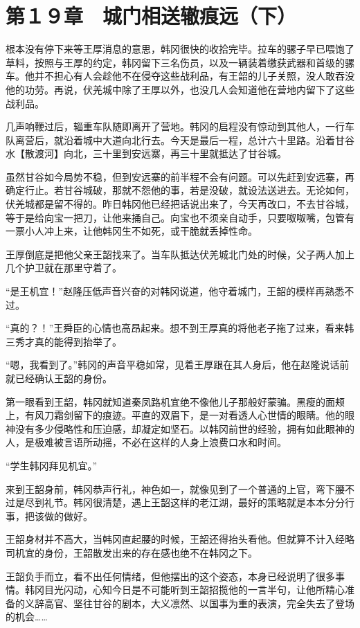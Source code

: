 \section{第１９章　城门相送辙痕远（下）}

根本没有停下来等王厚消息的意思，韩冈很快的收拾完毕。拉车的骡子早已喂饱了草料，按照与王厚的约定，韩冈留下三名伤员，以及一辆装着缴获武器和首级的骡车。他并不担心有人会趁他不在侵夺这些战利品，有王韶的儿子关照，没人敢吞没他的功劳。再说，伏羌城中除了王厚以外，也没几人会知道他在营地内留下了这些战利品。

几声响鞭过后，辎重车队随即离开了营地。韩冈的启程没有惊动到其他人，一行车队离营后，就沿着城中大道向北行去。今天是最后一程，总计六十里路。沿着甘谷水【散渡河】向北，三十里到安远寨，再三十里就抵达了甘谷城。

虽然甘谷如今局势不稳，但到安远寨的前半程不会有问题。可以先赶到安远寨，再确定行止。若甘谷城破，那就不怨他的事，若是没破，就设法送进去。无论如何，伏羌城都是留不得的。昨日韩冈他已经把话说出来了，今天再改口，不去甘谷城，等于是给向宝一把刀，让他来捅自己。向宝也不须亲自动手，只要呶呶嘴，包管有一票小人冲上来，让他韩冈生不如死，或干脆就丢掉性命。

王厚倒底是把他父亲王韶找来了。当车队抵达伏羌城北门处的时候，父子两人加上几个护卫就在那里守着了。

“是王机宜！”赵隆压低声音兴奋的对韩冈说道，他守着城门，王韶的模样再熟悉不过。

“真的？！”王舜臣的心情也高昂起来。想不到王厚真的将他老子拖了过来，看来韩三秀才真的能得到抬举了。

“嗯，我看到了。”韩冈的声音平稳如常，见着王厚跟在其人身后，他在赵隆说话前就已经确认王韶的身份。

第一眼看到王韶，韩冈就知道秦凤路机宜绝不像他儿子那般好蒙骗。黑瘦的面颊上，有风刀霜剑留下的痕迹。平直的双眉下，是一对看透人心世情的眼睛。他的眼神没有多少侵略性和压迫感，却凝定如坚石。以韩冈前世的经验，拥有如此眼神的人，是极难被言语所动摇，不必在这样的人身上浪费口水和时间。

“学生韩冈拜见机宜。”

来到王韶身前，韩冈恭声行礼，神色如一，就像见到了一个普通的上官，弯下腰不过是尽到礼节。韩冈很清楚，遇上王韶这样的老江湖，最好的策略就是本本分分行事，把该做的做好。

王韶身材并不高大，当韩冈直起腰的时候，王韶还得抬头看他。但就算不计入经略司机宜的身份，王韶散发出来的存在感也绝不在韩冈之下。

王韶负手而立，看不出任何情绪，但他摆出的这个姿态，本身已经说明了很多事情。韩冈目光闪动，心知今日是不可能听到王韶招揽他的一言半句，让他所精心准备的义辞高官、坚往甘谷的剧本，大义凛然、以国事为重的表演，完全失去了登场的机会……

